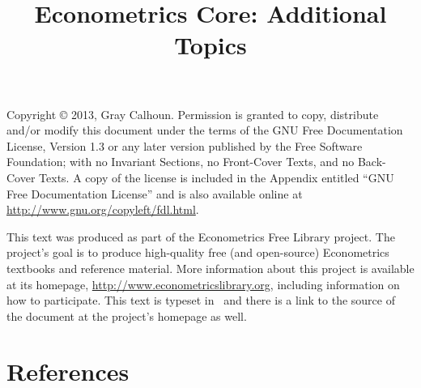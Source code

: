 \documentclass[nofonts]{tufte-latex/tufte-handout}
\title{Econometrics Core: Additional Topics}
\begin{document}
\maketitle

\bigskip\noindent%
Copyright © 2013, Gray Calhoun.  Permission is granted to copy,
distribute and/or modify this document under the terms of the GNU Free
Documentation License, Version 1.3 or any later version published by
the Free Software Foundation; with no Invariant Sections, no
Front-Cover Texts, and no Back-Cover Texts.  A copy of the license is
included in the Appendix entitled ``GNU Free Documentation License''
and is also available online at
\url{http://www.gnu.org/copyleft/fdl.html}.

This text was produced as part of the Econometrics Free Library
project.  The project's goal is to produce high-quality free (and
open-source) Econometrics textbooks and reference material.  More
information about this project is available at its homepage,
\url{http://www.econometricslibrary.org}, including information on how
to participate.  This text is typeset in \XeLaTeX\ and there is a link
to the source of the document at the project's homepage as well.

%
\tableofcontents





\appendix


\part*{References}%

\end{document}
